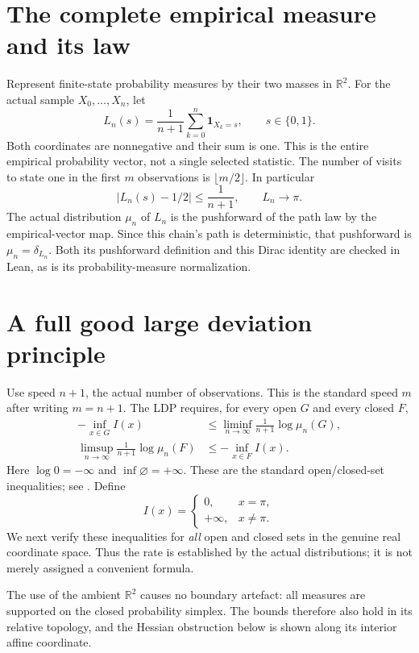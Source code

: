 \documentclass[11pt]{article}
\begin{document}
\section*{The complete empirical measure and its law}
Represent finite-state probability measures by their
two masses in $\mathbb R^2$. For the actual sample
$X_0,\ldots,X_n$, let
\[
 L_n(s)=\frac1{n+1}\sum_{k=0}^n\boldsymbol1_{X_k=s},
               \qquad s\in\{0,1\}.
\]
Both coordinates are nonnegative and their sum is one.
This is the entire empirical probability vector, not a
single selected statistic. The number of visits to state
one in the first $m$ observations is $\lfloor m/2\rfloor$.
In particular
\[
       |L_n(s)-1/2|\leq\frac1{n+1},\qquad L_n\to\pi.
\]
The actual distribution $\mu_n$ of $L_n$ is the pushforward
of the path law by the empirical-vector map. Since this
chain's path is deterministic, that pushforward is
$\mu_n=\delta_{L_n}$. Both its pushforward definition and
this Dirac identity are checked in Lean, as is its
probability-measure normalization.

\section*{A full good large deviation principle}
Use speed $n+1$, the actual number of observations. This
is the standard speed $m$ after writing $m=n+1$.
The LDP requires, for every open $G$ and every closed $F$,
\begin{align*}
 -\inf_{x\in G}I(x)&\leq
     \liminf_{n\to\infty}\frac1{n+1}\log\mu_n(G),\\
 \limsup_{n\to\infty}\frac1{n+1}\log\mu_n(F)&\leq
     -\inf_{x\in F}I(x).
\end{align*}
Here $\log0=-\infty$ and $\inf\varnothing=+\infty$.
These are the standard open/closed-set inequalities;
see \cite[Section 2]{varadhan}. Define
\[
 I(x)=\begin{cases}0,&x=\pi,\\+\infty,&x\ne\pi.\end{cases}
\]
We next verify these inequalities for \emph{all} open
and closed sets in the genuine real coordinate space.
Thus the rate is established by the actual distributions;
it is not merely assigned a convenient formula.

The use of the ambient $\mathbb R^2$ causes no boundary
artefact: all measures are supported on the closed
probability simplex. The bounds therefore also hold in
its relative topology, and the Hessian obstruction below
is shown along its interior affine coordinate.
\end{document}
